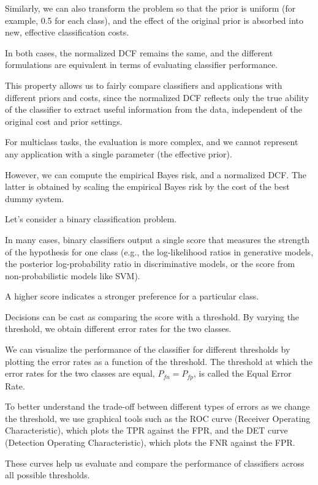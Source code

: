 Similarly, we can also transform the problem so that the prior is uniform (for example, 0.5 for each class), and the effect of the original prior is absorbed into new, effective classification costs.

In both cases, the normalized DCF remains the same, and the different formulations are equivalent in terms of evaluating classifier performance.

This property allows us to fairly compare classifiers and applications with different priors and costs, since the normalized DCF reflects only the true ability of the classifier to extract useful information from the data, independent of the original cost and prior settings.

For multiclass tasks, the evaluation is more complex, and we cannot represent any application with a single parameter (the effective prior).

However, we can compute the empirical Bayes risk, and a normalized DCF. The latter is obtained by scaling the empirical Bayes risk by the cost of the best dummy system.

Let's consider a binary classification problem.

In many cases, binary classifiers output a single score that measures the strength of the hypothesis for one class (e.g., the log-likelihood ratios in generative models, the posterior log-probability ratio in discriminative models, or the score from non-probabilistic models like SVM).

A higher score indicates a stronger preference for a particular class.

Decisions can be cast as comparing the score with a threshold. By varying the threshold, we obtain different error rates for the two classes.

We can visualize the performance of the classifier for different thresholds by plotting the error rates as a function of the threshold. The threshold at which the error rates for the two classes are equal, $P_{fn} = P_{fp}$, is called the Equal Error Rate.

To better understand the trade-off between different types of errors as we change the threshold, we use graphical tools such as the ROC curve (Receiver Operating Characteristic), which plots the TPR against the FPR, and the DET curve (Detection Operating Characteristic), which plots the FNR against the FPR.

These curves help us evaluate and compare the performance of classifiers across all possible thresholds.

